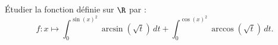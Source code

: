 Étudier la fonction définie sur $\R$ par : \[ f:x \mapsto \int_{0}^{\sin(x)^2}  \arcsin(\sqrt{t}) \, dt +\int_{0}^{\cos(x)^2}  \arccos(\sqrt{t}) \, dt.\]
